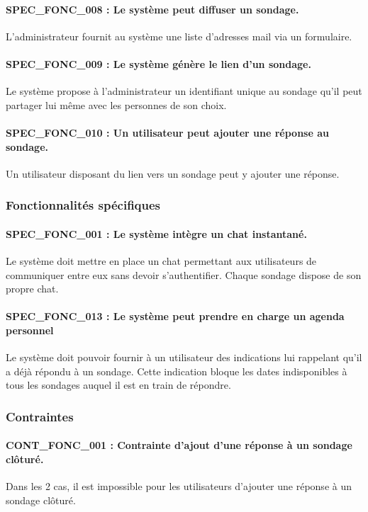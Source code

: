 \documentclass[titlepage]{report}
\begin{document}
\paragraph{SPEC\_FONC\_008 : Le système peut diffuser un sondage.}
L’administrateur fournit au système une liste d’adresses mail via un formulaire. 

\paragraph{SPEC\_FONC\_009 : Le système génère le lien d’un sondage.}
Le système propose à l’administrateur un identifiant unique au sondage qu’il peut partager lui même avec les personnes de son choix.

\paragraph{SPEC\_FONC\_010 : Un utilisateur peut ajouter une réponse au sondage.}
Un utilisateur disposant du lien vers un sondage peut y ajouter une réponse. 

\subsubsection{Fonctionnalités spécifiques}

\paragraph{SPEC\_FONC\_001 : Le système intègre un chat instantané.}
Le système doit mettre en place un chat permettant aux utilisateurs de communiquer entre eux sans devoir s’authentifier. Chaque sondage dispose de son propre chat.

\paragraph{SPEC\_FONC\_013 : Le système peut prendre en charge un agenda personnel}
Le système doit pouvoir fournir à un utilisateur des indications lui rappelant qu’il a déjà répondu à un sondage. Cette indication bloque les dates indisponibles à tous les sondages auquel il est en train de répondre.

\subsubsection{Contraintes}
\paragraph{CONT\_FONC\_001 : Contrainte d’ajout d’une réponse à un sondage clôturé.}
Dans les 2 cas, il est impossible pour les utilisateurs d’ajouter une réponse à un sondage clôturé.
\end{document}
